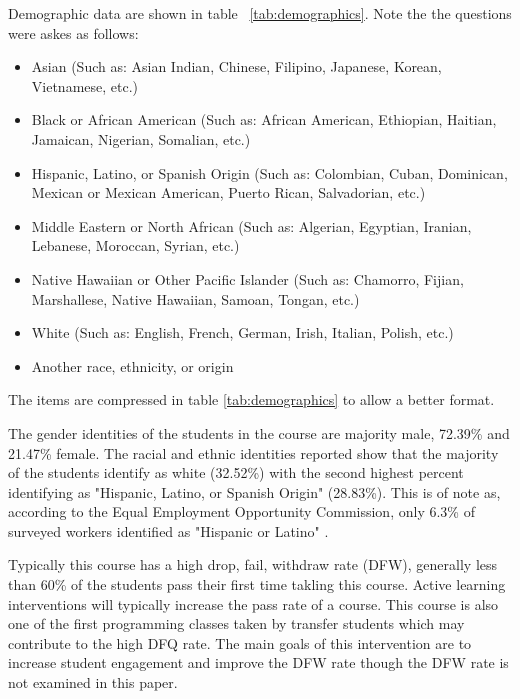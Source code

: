\documentclass[12pt]{article}
\begin{document}
Demographic data are shown in table ~\ref{tab:demographics}. Note the the questions were askes as follows: 
\begin{itemize}
    \item Asian (Such as: Asian Indian, Chinese, Filipino, Japanese, Korean, Vietnamese, etc.) 
    \item Black or African American (Such as: African American, Ethiopian, Haitian, Jamaican, Nigerian, Somalian, etc.)
    \item Hispanic, Latino, or Spanish Origin (Such as: Colombian, Cuban, Dominican, Mexican or Mexican American, Puerto Rican, Salvadorian, etc.)
    \item Middle Eastern or North African (Such as: Algerian, Egyptian, Iranian, Lebanese, Moroccan, Syrian, etc.)
    \item Native Hawaiian or Other Pacific Islander (Such as: Chamorro, Fijian, Marshallese, Native Hawaiian, Samoan, Tongan, etc.)
    \item  White (Such as: English, French, German, Irish, Italian, Polish, etc.)
    \item Another race, ethnicity, or origin
\end{itemize}
The items are compressed in table \ref{tab:demographics} to allow a better format.

The gender identities of the students in the course are majority male, 72.39\% and 21.47\% female.  The racial and ethnic identities reported show that the majority of the students identify as white (32.52\%) with the second highest percent identifying as "Hispanic, Latino, or Spanish Origin" (28.83\%). This is of note as, according to the Equal Employment Opportunity Commission, only 6.3\% of surveyed workers identified as "Hispanic or Latino" \cite{DIVERSITYHIGHTECH}.

Typically this course has a high drop, fail, withdraw rate (DFW), generally less than 60\% of the students pass their first time takling this course.  Active learning interventions will typically increase the pass rate of a course. This course is also one of the first programming classes taken by transfer students which may contribute to the high DFQ rate. The main goals of this intervention are to increase student engagement and improve the DFW rate though the DFW rate is not examined in this paper.  
\end{document}
